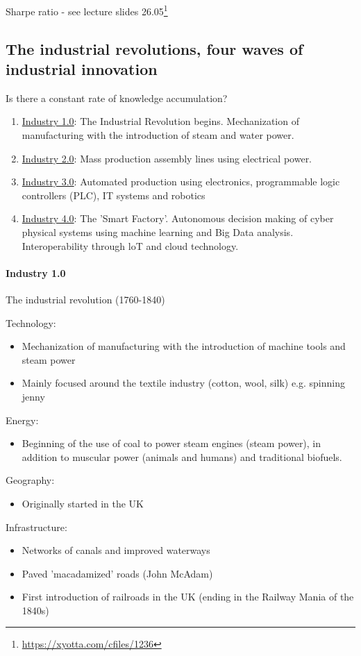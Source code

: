 \vspace{1\baselineskip}

Sharpe ratio - see lecture slides 26.05\footnote{\url{https://xyotta.com/cfiles/1236}}

\subsection{The industrial revolutions, four waves of industrial innovation}

Is there a constant rate of knowledge accumulation?

\begin{enumerate}[]
    \item \underline{Industry 1.0}: The Industrial Revolution begins.
        Mechanization of manufacturing with the introduction of steam and
        water power.
    \item \underline{Industry 2.0}: Mass production assembly lines using
        electrical power.
    \item \underline{Industry 3.0}: Automated production using electronics,
        programmable logic controllers (PLC), IT systems and robotics
    \item \underline{Industry 4.0}: The 'Smart Factory'. Autonomous decision
        making of cyber physical systems using machine learning and Big Data
        analysis. Interoperability through loT and cloud technology.
\end{enumerate}

\paragraph{Industry 1.0} The industrial revolution (1760-1840)

Technology:
\begin{itemize}
    \item Mechanization of manufacturing with the introduction of machine tools
        and steam power
    \item Mainly focused around the textile industry (cotton, wool, silk) e.g.
        spinning jenny
\end{itemize}
Energy:
\begin{itemize}
    \item Beginning of the use of coal to power steam engines (steam power),
        in addition to muscular power (animals and humans) and traditional
        biofuels.
\end{itemize}
Geography:
\begin{itemize}
    \item Originally started in the UK
\end{itemize}
Infrastructure:
\begin{itemize}
    \item Networks of canals and improved waterways
    \item Paved 'macadamized' roads (John McAdam)
    \item First introduction of railroads in the UK (ending in the Railway
        Mania of the 1840s)
\end{itemize}

